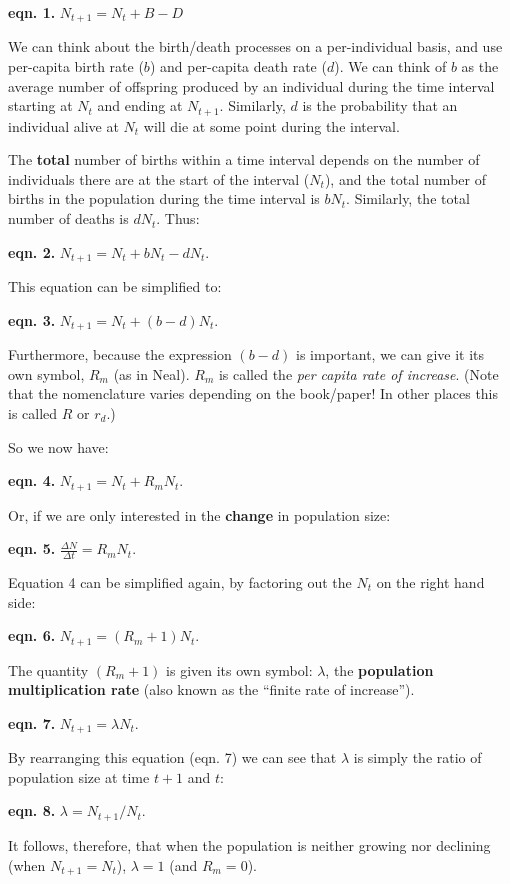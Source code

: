\documentclass[
  a4paper]{book}
\begin{document}
\textbf{eqn. 1.} \(N_{t+1} = N_t + B - D\)

We can think about the birth/death processes on a per-individual basis, and use per-capita birth rate (\(b\)) and per-capita death rate (\(d\)). We can think of \(b\) as the average number of offspring produced by an individual during the time interval starting at \(N_t\) and ending at \(N_{t+1}\). Similarly, \(d\) is the probability that an individual alive at \(N_t\) will die at some point during the interval.

The \textbf{total} number of births within a time interval depends on the number of individuals there are at the start of the interval (\(N_t\)), and the total number of births in the population during the time interval is \(bN_t\). Similarly, the total number of deaths is \(dN_t\). Thus:

\textbf{eqn. 2.} \(N_{t+1} = N_t + bN_t - dN_t\).

This equation can be simplified to:

\textbf{eqn. 3.} \(N_{t+1} = N_t + (b-d)N_t\).

Furthermore, because the expression \((b-d)\) is important, we can give it its own symbol, \(R_m\) (as in Neal). \(R_m\) is called the \emph{per capita rate of increase}. (Note that the nomenclature varies depending on the book/paper! In other places this is called \(R\) or \(r_d\).)

So we now have:

\textbf{eqn. 4.} \(N_{t+1} = N_t + R_m N_t\).

Or, if we are only interested in the \textbf{change} in population size:

\textbf{eqn. 5.} \(\frac{\Delta N}{\Delta t} = R_m N_t\).

Equation 4 can be simplified again, by factoring out the \(N_t\) on the right hand side:

\textbf{eqn. 6.} \(N_{t+1} = (R_m + 1)N_t\).

The quantity \((R_m+1)\) is given its own symbol: \(\lambda\), the \textbf{population multiplication rate} (also known as the ``finite rate of increase'').

\textbf{eqn. 7.} \(N_{t+1} = \lambda N_t\).

By rearranging this equation (eqn. 7) we can see that \(\lambda\) is simply the ratio of population size at time \(t+1\) and \(t\):

\textbf{eqn. 8.} \(\lambda = N_{t+1}/N_t\).

It follows, therefore, that when the population is neither growing nor declining (when \(N_{t+1}=N_t\)), \(\lambda = 1\) (and \(R_m = 0\)).
\end{document}
